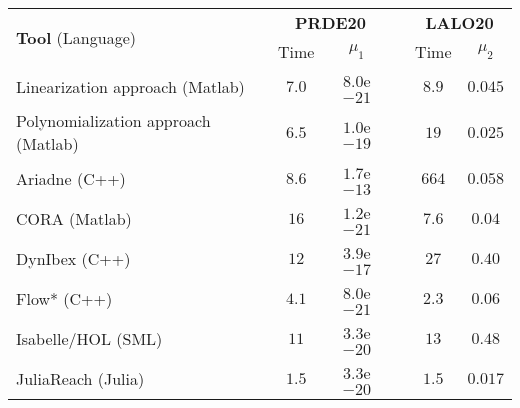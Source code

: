 
\begin{center}
\begin{footnotesize}
\begin{tabular}{l  c c  c  c c}
 \toprule
 \multirow{2}{*}{\textbf{Tool} (Language)} & \multicolumn{2}{c}{\textbf{PRDE20}} & & \multicolumn{2}{c}{\textbf{LALO20}} \\ \cmidrule{2-3} \cmidrule{5-6}
  & Time & $\mu_1$ & & Time & $\mu_2$ \\ \midrule
 Linearization approach (Matlab)		& $7.0$ 	& $8.0$e$-21$ & & $8.9$ 	& $0.045$ \\
 Polynomialization approach	(Matlab)	& $6.5$ 	& $1.0$e$-19$ & & $19$      & $0.025$ \\ \midrule
 Ariadne (C++)				            & $8.6$ 	& $1.7$e$-13$ & & $664$ 	& $0.058$ \\
 CORA (Matlab)				            & $16$ 	    & $1.2$e$-21$ & & $7.6$ 	& $0.04$ \\
 DynIbex (C++)				            & $12$ 	    & $3.9$e$-17$ & & $27$ 	    & $0.40$ \\
 Flow* (C++)				            & $4.1$ 	& $8.0$e$-21$ & & $2.3$ 	& $0.06$ \\
 Isabelle/HOL (SML)			            & $11$ 	    & $3.3$e$-20$ & & $13$ 	    & $0.48$ \\
 JuliaReach (Julia)			            & $1.5$ 	& $3.3$e$-20$ & & $1.5$ 	& $0.017$ \\
\bottomrule 
\end{tabular}
\end{footnotesize}
\end{center}
